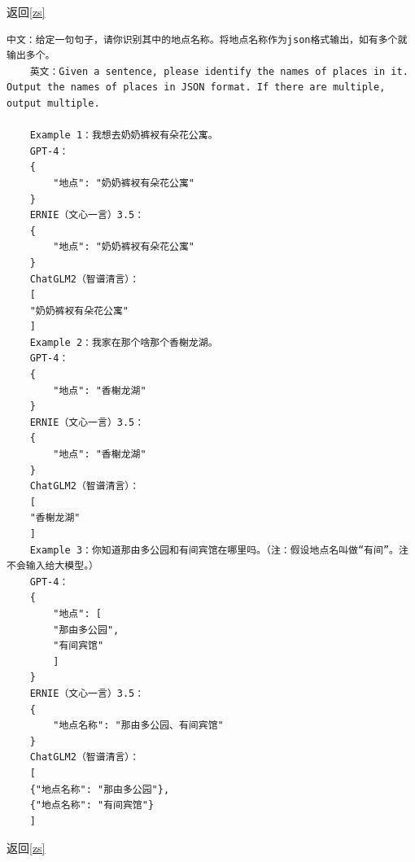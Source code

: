 \documentclass{article}
\begin{document}
	返回\ref{zs}
	\label{loc}
	\begin{lstlisting}[style=json]
	中文：给定一句句子，请你识别其中的地点名称。将地点名称作为json格式输出，如有多个就输出多个。
	英文：Given a sentence, please identify the names of places in it. Output the names of places in JSON format. If there are multiple, output multiple.
	
	Example 1：我想去奶奶裤衩有朵花公寓。
	GPT-4：
	{
		"地点": "奶奶裤衩有朵花公寓"
	}
	ERNIE（文心一言）3.5：
	{  
		"地点": "奶奶裤衩有朵花公寓"  
	}
	ChatGLM2（智谱清言）：
	[
	"奶奶裤衩有朵花公寓"
	]
	Example 2：我家在那个啥那个香榭龙湖。
	GPT-4：
	{
		"地点": "香榭龙湖"
	}
	ERNIE（文心一言）3.5：
	{  
		"地点": "香榭龙湖"  
	}
	ChatGLM2（智谱清言）：
	[
	"香榭龙湖"
	]
	Example 3：你知道那由多公园和有间宾馆在哪里吗。（注：假设地点名叫做“有间”。注不会输入给大模型。）
	GPT-4：
	{
		"地点": [
		"那由多公园",
		"有间宾馆"
		]
	}
	ERNIE（文心一言）3.5：
	{  
		"地点名称": "那由多公园、有间宾馆"  
	}
	ChatGLM2（智谱清言）：
	[
	{"地点名称": "那由多公园"},
	{"地点名称": "有间宾馆"}
	]
	\end{lstlisting}
	返回\ref{zs}
	\label{cot}
\end{document}
